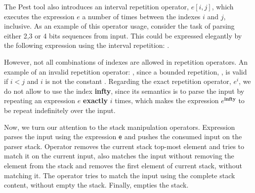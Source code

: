 \documentclass[sigplan,screen]{acmart}
\theoremstyle{definition}
\begin{document}
The Pest tool also introduces an interval repetition operator, $e[i,j]$,
which executes the expression $e$ a number of times between the indexes $i$
and $j$, inclusive. As an example of this operator usage, consider the
task of parsing either 2,3 or 4 bits sequences from input. This could be
expressed elegantly by the following expression using the interval repetition:
.

However, not all combinations of indexes are allowed in repetition operators.
An example of an invalid repetition operator: , since a
bounded repetition, , is valid if $i < j$ and $i$ is not the constant
. Regarding the exact repetition operator, $e^i$, we do not allow to use
the index \textbf{infty}, since its semantics is to parse the input by repeating
an expression $e$ \textbf{exactly} $i$ times, which makes the expression
$e^{\mathbf{infty}}$ to be repeat indefinitely over the input.

Now, we turn our attention to the stack manipulation operators. Expression
 parses the input using the expression \texttt{e} and pushes the
consumed input on the parser stack. Operator  removes the current
stack top-most element and tries to match it on the current input,
 also matches the input without removing the element from the
stack and  removes the first element of current stack, without
matching it. The operator  tries to match the input using the
complete stack content, without empty the stack. Finally, 
empties the stack.
\end{document}
